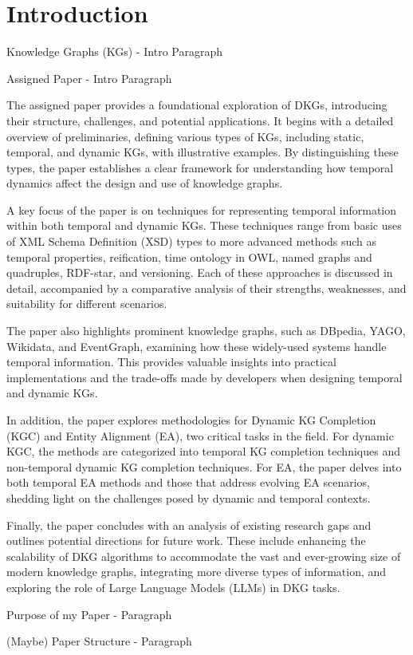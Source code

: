 \section{Introduction}

Knowledge Graphs (KGs) - Intro Paragraph

Assigned Paper \cite{alam2024} - Intro Paragraph

The assigned paper \cite{alam2024} provides a foundational exploration of DKGs, introducing their structure, challenges, and potential applications. It begins with a detailed overview of preliminaries, defining various types of KGs, including static, temporal, and dynamic KGs, with illustrative examples. By distinguishing these types, the paper establishes a clear framework for understanding how temporal dynamics affect the design and use of knowledge graphs.

A key focus of the paper is on techniques for representing temporal information within both temporal and dynamic KGs. These techniques range from basic uses of XML Schema Definition (XSD) types to more advanced methods such as temporal properties, reification, time ontology in OWL, named graphs and quadruples, RDF-star, and versioning. Each of these approaches is discussed in detail, accompanied by a comparative analysis of their strengths, weaknesses, and suitability for different scenarios.

The paper also highlights prominent knowledge graphs, such as DBpedia, YAGO, Wikidata, and EventGraph, examining how these widely-used systems handle temporal information. This provides valuable insights into practical implementations and the trade-offs made by developers when designing temporal and dynamic KGs.

In addition, the paper explores methodologies for Dynamic KG Completion (KGC) and Entity Alignment (EA), two critical tasks in the field. For dynamic KGC, the methods are categorized into temporal KG completion techniques and non-temporal dynamic KG completion techniques. For EA, the paper delves into both temporal EA methods and those that address evolving EA scenarios, shedding light on the challenges posed by dynamic and temporal contexts.

Finally, the paper concludes with an analysis of existing research gaps and outlines potential directions for future work. These include enhancing the scalability of DKG algorithms to accommodate the vast and ever-growing size of modern knowledge graphs, integrating more diverse types of information, and exploring the role of Large Language Models (LLMs) in DKG tasks.

Purpose of my Paper - Paragraph

(Maybe) Paper Structure - Paragraph
